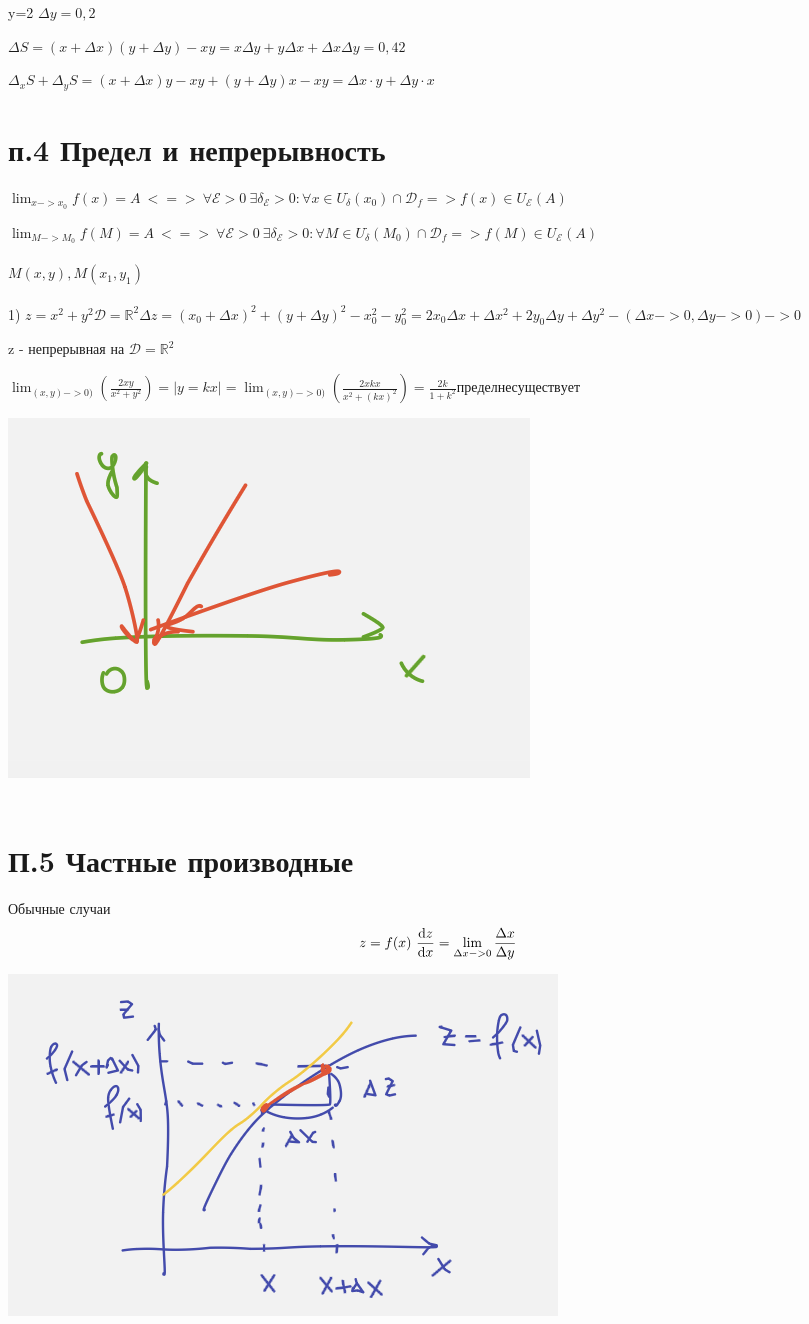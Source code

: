 \documentclass{article}
\begin{document}
y=2 $\Delta y =0,2 $

$\Delta S = (x+\Delta x)(y+\Delta y) - xy = x \Delta y + y \Delta x +\Delta x \Delta y = 0,42$


$\Delta_x S + \Delta_y S = (x + \Delta x)y - xy + (y +\Delta y)x  - xy = \Delta x \cdot y + \Delta y \cdot x$


\section{п.4 Предел и непрерывность }

$\lim_{x -> x_0}f(x) = A\ <=>\ \forall \mathcal{E} >0 \ \exists \delta_{\mathcal{E}}>0 : \forall x \in U^{\cdot}_{\delta}(x_0) \cap \mathcal{D}_f => f(x) \in U_{\mathcal{E}}(A)$


$\lim_{M -> M_0}f(M) = A\ <=>\ \forall \mathcal{E} >0 \ \exists \delta_{\mathcal{E}}>0 : \forall M \in U^{\cdot}_{\delta}(M_0) \cap \mathcal{D}_f => f(M) \in U_{\mathcal{E}}(A)$
\\ \\
$M(x, y), M(x_1, y_1)$
\\ \\
1) $z = x^2 +y^2 \mathcal{D} = \mathbb{R}^2 \Delta z= (x_0 + \Delta x)^2 + (y+ \Delta y)^2 - x_0^2 - y_0^2 = 2x_0 \Delta x + \Delta x^2 +2y_0\Delta y + \Delta y^2 - (\Delta x ->0,  \Delta y ->0) -> 0 $

z - непрерывная на $\mathcal{D} = \mathbb{R}^2$

$\lim_{(x, y)-> 0)}(\frac{2xy}{x^2 +y^2}) = |y = kx| = \lim_{(x, y)-> 0)}(\frac{2xkx}{x^2 +(kx)^2}) = \frac{2k}{1+k^2} предел не существует
$

\includegraphics[width=.3\textwidth]{lines} 
\\ \\
\section{П.5 Частные производные}

Обычные случаи 
\begin{equation*}
    z = f(x)\ \dv{z}{x}= \lim_{\Delta x-> 0}\frac{\Delta x}{\Delta y}
\end{equation*}
\begin{center}
    \includegraphics[width=.3\textwidth]{f(x).png} 
\end{center}
\end{document}
